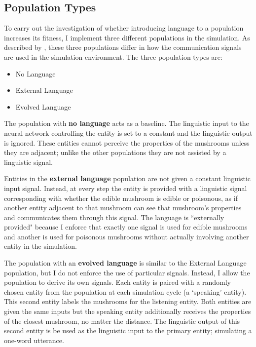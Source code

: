 \documentclass[12pt,a4paper]{report}
\begin{document}
\subsection{Population Types}\label{section:populations}

To carry out the investigation of whether introducing language to a population increases its fitness, I implement three different populations in the simulation. As described by \cite{Cangelosi1998}, these three populations differ in how the communication signals are used in the simulation environment. The three population types are:

\begin{itemize}
	\item No Language
	\item External Language
	\item Evolved Language
\end{itemize}

The population with {\bf no language} acts as a baseline. The linguistic input to the neural network controlling the entity is set to a constant and the linguistic output is ignored. These entities cannot perceive the properties of the mushrooms unless they are adjacent; unlike the other populations they are not assisted by a linguistic signal.

Entities in the {\bf external language} population are not given a constant linguistic input signal. Instead, at every step the entity is provided with a linguistic signal corresponding with whether the edible mushroom is edible or poisonous, as if another entity adjacent to that mushroom can see that mushroom's properties and communicates them through this signal. The language is ``externally provided" because I enforce that exactly one signal is used for edible mushrooms and another is used for poisonous mushrooms without actually involving another entity in the simulation. 

The population with an {\bf evolved language} is similar to the External Language population, but I do not enforce the use of particular signals. Instead, I allow the population to derive its own signals. Each entity is paired with a randomly chosen entity from the population at each simulation cycle (a `speaking' entity). This second entity labels the mushrooms for the listening entity. Both entities are given the same inputs but the speaking entity additionally receives the properties of the closest mushroom, no matter the distance. The linguistic output of this second entity is be used as the linguistic input to the primary entity; simulating a one-word utterance.
\end{document}

